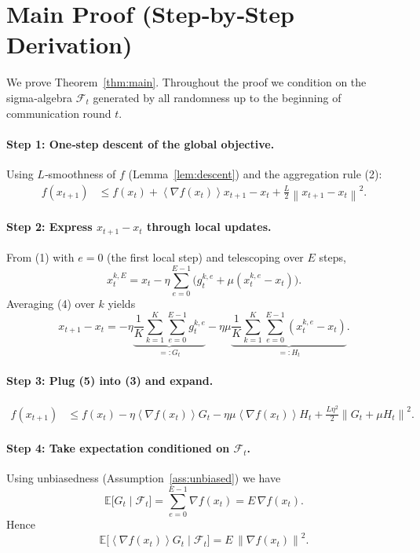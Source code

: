 \documentclass{article}
\newcommand{\E}{\mathbb{E}}
\newcommand{\norm}[1]{\left\|#1\right\|}
\newcommand{\inner}[1]{\left\langle #1 \right\rangle}
\begin{document}
\section*{Main Proof (Step‑by‑Step Derivation)}
We prove Theorem~\ref{thm:main}.  Throughout the proof we condition on the sigma‑algebra
$\mathcal{F}_t$ generated by all randomness up to the beginning of communication round $t$.

\paragraph{Step 1: One‑step descent of the global objective.}
Using $L$‑smoothness of $f$ (Lemma~\ref{lem:descent}) and the aggregation rule (2):
\begin{align}
f(x_{t+1}) 
&\le f(x_t)+\inner{\nabla f(x_t)}{x_{t+1}-x_t}
   +\frac{L}{2}\norm{x_{t+1}-x_t}^2. \tag{3}
\end{align}
\paragraph{Step 2: Express $x_{t+1}-x_t$ through local updates.}
From (1) with $e=0$ (the first local step) and telescoping over $E$ steps,
\[
x_{t}^{k,E}=x_t-\eta\sum_{e=0}^{E-1}\bigl(g_{t}^{k,e}+ \mu(x_{t}^{k,e}-x_t)\bigr). \tag{4}
\]
Averaging (4) over $k$ yields
\[
x_{t+1}-x_t = -\eta\underbrace{\frac1K\sum_{k=1}^K\sum_{e=0}^{E-1}g_{t}^{k,e}}_{=:G_t}
               -\eta\mu\underbrace{\frac1K\sum_{k=1}^K\sum_{e=0}^{E-1}(x_{t}^{k,e}-x_t)}_{=:H_t}. \tag{5}
\]

\paragraph{Step 3: Plug (5) into (3) and expand.}
\begin{align}
f(x_{t+1}) 
&\le f(x_t)-\eta\inner{\nabla f(x_t)}{G_t}
        -\eta\mu\inner{\nabla f(x_t)}{H_t}
        +\frac{L\eta^2}{2}\norm{G_t+\mu H_t}^2. \tag{6}
\end{align}
\paragraph{Step 4: Take expectation conditioned on $\mathcal{F}_t$.}
Using unbiasedness (Assumption~\ref{ass:unbiased}) we have
\[
\E\!\bigl[G_t\mid\mathcal{F}_t\bigr]=\sum_{e=0}^{E-1}\nabla f(x_t)
               =E\,\nabla f(x_t). \tag{7}
\]
Hence
\[
\E\!\bigl[\inner{\nabla f(x_t)}{G_t}\mid\mathcal{F}_t\bigr]
      =E\,\norm{\nabla f(x_t)}^2. \tag{8}
\]
\end{document}
